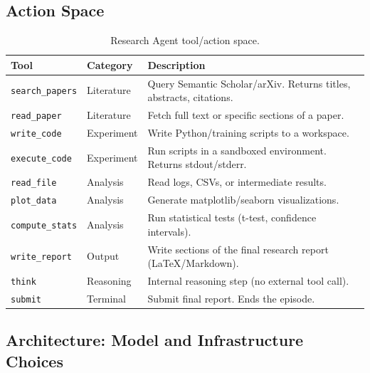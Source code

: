 \subsection{Action Space}
\label{action-space}

\begin{table}[ht!]
\centering
\caption{Research Agent tool/action space.}
\begin{tabular}{@{}lp{5cm}p{8cm}@{}}
\toprule
\textbf{Tool} & \textbf{Category} & \textbf{Description} \\
\midrule
\texttt{search\_papers} & Literature & Query Semantic Scholar/arXiv. Returns titles, abstracts, citations. \\
\texttt{read\_paper} & Literature & Fetch full text or specific sections of a paper. \\
\texttt{write\_code} & Experiment & Write Python/training scripts to a workspace. \\
\texttt{execute\_code} & Experiment & Run scripts in a sandboxed environment. Returns stdout/stderr. \\
\texttt{read\_file} & Analysis & Read logs, CSVs, or intermediate results. \\
\texttt{plot\_data} & Analysis & Generate matplotlib/seaborn visualizations. \\
\texttt{compute\_stats} & Analysis & Run statistical tests (t-test, confidence intervals). \\
\texttt{write\_report} & Output & Write sections of the final research report (LaTeX/Markdown). \\
\texttt{think} & Reasoning & Internal reasoning step (no external tool call). \\
\texttt{submit} & Terminal & Submit final report. Ends the episode. \\
\bottomrule
\end{tabular}
\end{table}

\subsection{Architecture: Model and Infrastructure Choices}
\label{architecture-model-and-infrastructure-choices}

